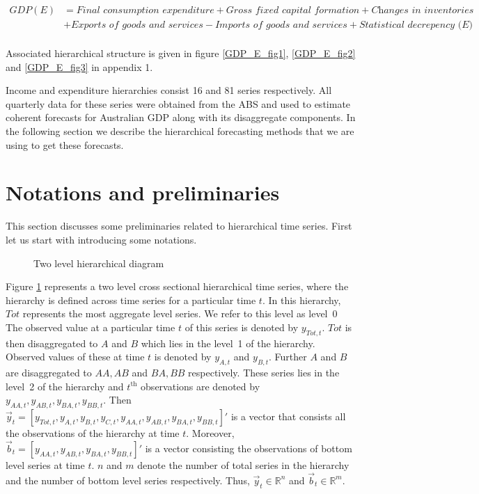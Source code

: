 \documentclass[graybox]{svmult}
\begin{document}
\begin{small}
	\begin{align*}
	GDP(E) &= \textit{Final consumption expenditure} + \textit{Gross fixed capital formation} + \textit{Changes in inventories}\\ &+ \textit{Exports of goods and services} - \textit{Imports of goods and services} + \textit{Statistical decrepency (E)}\\
	\end{align*}
\end{small}
Associated hierarchical structure is given in figure \ref{GDP_E_fig1}, \ref{GDP_E_fig2} and \ref{GDP_E_fig3} in appendix 1. 

Income and expenditure hierarchies consist 16 and 81 series respectively. All quarterly data for these series were obtained from the ABS and used to estimate coherent forecasts for Australian GDP along with its disaggregate components. In the following section we describe the hierarchical forecasting methods that we are using to get these forecasts. 

\section{Notations and preliminaries} 

This section discusses some preliminaries related to hierarchical time series. First let us start with introducing some notations. 

\begin{figure}[H]
	\begin{center}
		  
		 
		\qobitree
	\end{center}
	\caption{Two level hierarchical diagram}\label{fig1}
\end{figure}

Figure \ref{fig1} represents a two level cross sectional hierarchical time series, where the hierarchy is defined across time series for a particular time $t$. In this hierarchy, $Tot$ represents the most aggregate level series. We refer to this level as level~0 The observed value at a particular time $t$ of this series is denoted by $y_{Tot,t}$. $Tot$ is then disaggregated to $A$ and $B$ which lies in the level~1 of the hierarchy. Observed values of these at time $t$ is denoted by $y_{A,t}$ and $y_{B,t} $. Further $A$ and $B$ are disaggregated to $AA, AB$ and $BA, BB$ respectively. These series lies in the level~2 of the hierarchy and $t^\text{th}$ observations are denoted by $y_{AA,t}, y_{AB,t}, y_{BA,t}, y_{BB,t}$. Then $\vec{y}_t = [y_{Tot,t},y_{A,t}, y_{B,t},y_{C,t},y_{AA,t}, y_{AB,t}, y_{BA,t}, y_{BB,t}]'$ is a vector that consists all the observations of the hierarchy at time $t$. Moreover, $\vec{b}_t = [y_{AA,t}, y_{AB,t}, y_{BA,t}, y_{BB,t}]'$ is a vector consisting the observations of bottom level series at time $t$. $n$ and $m$ denote the number of total series in the hierarchy and the number of bottom level series respectively. Thus, $\vec{y}_t \in \mathbb{R}^n$ and $\vec{b}_t \in \mathbb{R}^m$. 
\end{document}
